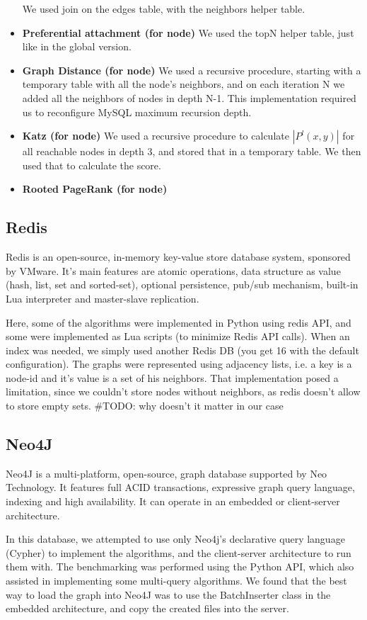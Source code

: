 \begin{itemize}
		We used join on the edges table, with the neighbors helper table.
	\item {\bf Preferential attachment (for node)}
		We used the topN helper table, just like in the global version.
	\item {\bf Graph Distance (for node)}
		We used a recursive procedure, starting with a temporary table with all the node's neighbors,
		and on each iteration N we added all the neighbors of nodes in depth N-1. This implementation
		required us to reconfigure MySQL maximum recursion depth.
	\item {\bf Katz (for node)}
		We used a recursive procedure to calculate $|P^l(x,y)|$ for all reachable nodes in depth 3,
		and stored that in a temporary table. We then used that to calculate the score.
	\item {\bf Rooted PageRank (for node)}

\end{itemize}

\subsection{Redis}
Redis is an open-source, in-memory key-value store database system, sponsored
by VMware. It's main features are atomic operations, data structure as value
(hash, list, set and sorted-set), optional persistence, pub/sub mechanism,
built-in Lua interpreter and master-slave replication. 

Here, some of the algorithms were implemented in Python using redis API, and
some were implemented as Lua scripts (to minimize Redis API calls). When an
index was needed, we simply used another Redis DB (you get 16 with the default
configuration). 
The graphs were represented using adjacency lists, i.e. a key is a node-id and
it's value is a set of his neighbors. That implementation posed a limitation,
since we couldn't store nodes without neighbors, as redis doesn't allow to
store empty sets. \#TODO: why doesn't it matter in our case 

\subsection{Neo4J}
Neo4J is a multi-platform, open-source, graph database supported by Neo
Technology. It features full ACID transactions, expressive graph query
language, indexing and high availability. It can operate in an embedded or
client-server architecture. 

In this database, we attempted to use only Neo4j's declarative query language
(Cypher) to implement the algorithms, and the client-server architecture to run
them with. The benchmarking was performed using the Python API, which also
assisted in implementing some multi-query algorithms. We found that the best
way to load the graph into Neo4J was to use the BatchInserter class in the
embedded architecture, and copy the created files into the server. 

